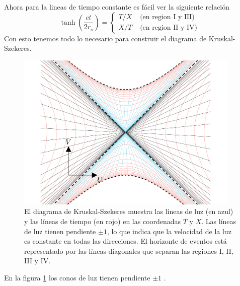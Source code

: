 \noindent Ahora para la lineas de tiempo constante es fácil ver la siguiente relación
\begin{equation}
    \tanh \left(\frac{ct}{2 r_s}\right)=\left\{\begin{array}{ll}
        T / X & \text { (en region I y III) } \\
        X / T & \text { (en region II y IV) }
        \end{array}\right.
\end{equation}
Con esto tenemos todo lo necesario para construir el diagrama de Kruskal-Szekeres.  
\begin{figure}[H]
    \begin{small}
        \begin{center}
            \includegraphics[width=0.95\textwidth]{AgujerosNegros/Schwarzschild/media/images/Kruskal_Szekeres_diagram_ManimCE_v0.19.0.png}
        \end{center}
        \caption{El diagrama de Kruskal-Szekeres muestra las líneas de luz (en azul) y las líneas de tiempo (en rojo) en las coordenadas \(T\) y \(X\). Las líneas de luz tienen pendiente \(\pm 1\), lo que indica que la velocidad de la luz es constante en todas las direcciones. El horizonte de eventos está representado por las líneas diagonales que separan las regiones I, II, III y IV.}
        \label{fig:Kruskal_Szekeres_diagram}
    \end{small}
\end{figure}
En la figura \ref{fig:Kruskal_Szekeres_diagram} los conos de luz tienen pendiente \(\pm 1\) .




